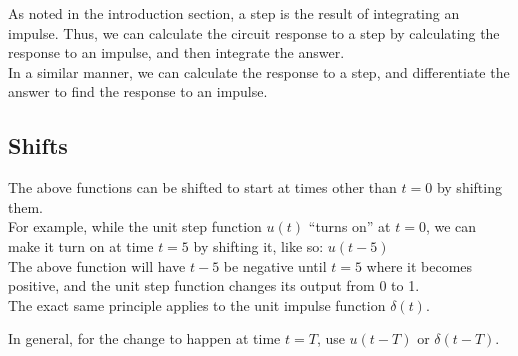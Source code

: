 \documentclass[12pt,a4paper]{report}
\begin{document}
As noted in the introduction section, a step is the result of integrating an impulse. Thus, we can calculate the circuit response to a step by calculating the response to an impulse, and then integrate the answer.\\
In a similar manner, we can calculate the response to a step, and differentiate the answer to find the response to an impulse.

\subsection{Shifts}
The above functions can be shifted to start at times other than $t = 0$ by shifting them.\\
For example, while the unit step function $u(t)$ ``turns on'' at $t = 0$, we can make it turn on at time $t = 5$ by shifting it, like so: $u(t - 5)$\\
The above function will have $t - 5$ be negative until $t = 5$ where it becomes positive, and the unit step function changes its output from 0 to 1.\\
The exact same principle applies to the unit impulse function $\delta(t)$.

In general, for the change to happen at time $t = T$, use $u(t - T)$ or $\delta(t - T)$.
\end{document}
